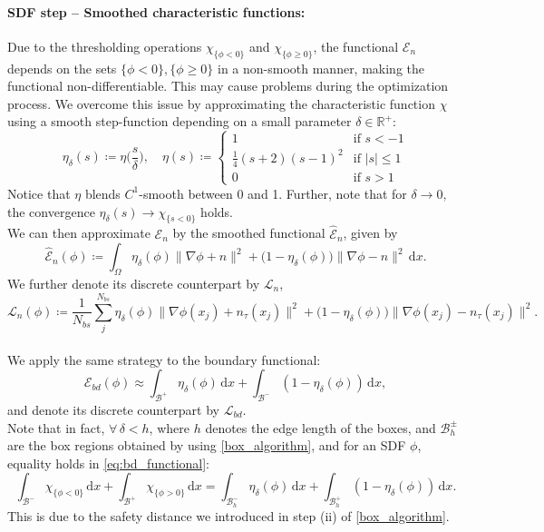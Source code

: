 \documentclass[12pt,openany]{book}
\theoremstyle{plainnormal}
\theoremstyle{remark}
\begin{document}
\paragraph{SDF step -- Smoothed characteristic functions:} Due to the thresholding operations $\chi_{\{\phi<0\}}$ and $\chi_{\{\phi\geq 0\}}$, the functional $\mathcal E_n$ depends on the sets $\{\phi<0\}, \{\phi\geq0\}$ in a non-smooth manner, making the functional non-differentiable. This may cause problems during the optimization process. We overcome this issue by approximating the characteristic function $\chi$ using a smooth step-function depending on a small parameter $\delta \in \mathbb R^+$:
$$\eta_\delta(s) \coloneqq \eta\Big(\frac{s}{\delta}\Big), \quad \eta(s) \coloneqq
    \begin{cases}
1 & \text{if } s < -1 \\
\frac{1}{4} (s+2)(s-1)^2 & \text{if } |s| \leq 1 \\
0 & \text{if }s > 1
\end{cases}
$$
Notice that $\eta$ blends $C^1$-smooth between 0 and 1. Further, note that for $\delta \rightarrow 0,$ the convergence $\eta_\delta(s) \rightarrow\chi_{\{s<0\}}$ holds.\\
We can then approximate $\mathcal E_n$ by the smoothed functional $\hat {\mathcal{E}}_n$, given by
$$\hat{\mathcal E}_n(\phi) \coloneqq \int_\Omega \eta_\delta(\phi)\|\nabla \phi + n\|^2 + \big(1 - \eta_\delta(\phi)\big)\|\nabla \phi - n\|^2 \, \mathrm{d}x.$$
We further denote its discrete counterpart by $\mathcal{L}_n$, $$\mathcal L_n(\phi) \coloneqq \frac{1}{N_{bs}}\sum_j^{N_{bs}}
\eta_\delta(\phi) \|\nabla \phi(x_j) + n_\tau(x_j)\|^2 + \big(1 - \eta_\delta(\phi)\big) \|\nabla \phi(x_j) - n_\tau(x_j)\|^2.$$\\
We apply the same strategy to the boundary functional: 
\begin{equation}\label{eq:bd_functional}
    \mathcal{E}_{bd}(\phi) \approx \int_\mathcal{B^+} \eta_\delta(\phi) \,\mathrm{d}x + \int_{\mathcal{B^-}}(1-\eta_\delta(\phi)) \,\mathrm{d}x,
\end{equation}
and denote its discrete counterpart by $\mathcal{L}_{bd}$.\\
Note that in fact, $\forall\, \delta < h$, where $h$ denotes the edge length of the boxes, and $\mathcal{B}_h^{\pm}$ are the box regions obtained by using \cref{box_algorithm}, and for an SDF $\phi$, equality holds in \cref{eq:bd_functional}:
 $$\int_{\mathcal B^-}\chi_{\{\phi < 0\}}\,\mathrm{d}x + \int_{\mathcal B^+}\chi_{\{\phi > 0\}} \,\mathrm{d}x = \int_{\mathcal{B}^{-}_h} \eta_\delta(\phi) \,\mathrm{d}x + \int_{\mathcal{B}^{+}_h}(1-\eta_\delta(\phi)) \,\mathrm{d}x.$$
This is due to the safety distance we introduced in step (ii) of \cref{box_algorithm}. 
\end{document}
